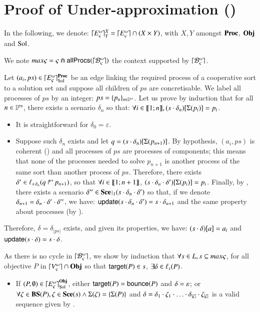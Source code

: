 \section{Proof of Under-approximation ()}
\label{suppl:demoapproxinf}

In the following, we denote:
$\lceil E_\varsigma^\omega\rceil^{X}_{Y} = \lceil E_\varsigma^\omega\rceil \cap (X \times Y)$, with $X, Y$ amongst $\mathbf{Proc}$, $\mathbf{Obj}$ and $\mathrm{Sol}$.

\begin{proofapproxinf}
We note $max\varsigma = \varsigma \Cap \mathsf{allProcs}(\lceil \mathcal{B}_\varsigma^\omega\rceil)$ the context supported by $\lceil \mathcal{B}_\varsigma^\omega\rceil$.

Let $(a_i, ps) \in \lceil E_\varsigma^\omega\rceil^{\mathbf{Proc}}_{\mathrm{Sol}}$ be an edge linking the required process of a cooperative sort to a solution set and suppose all children of $ps$ are concretisable.
We label all processes of $ps$ by an integer: $ps = \{ p_n \}_{n \in \mathbb{I}^{ps}}$.
Let us prove by induction that for all $n \in \mathbb{I}^{ps}$, there exists a scenario $\delta_n$ so that:
$\forall i \in \llbracket 1; n \rrbracket, {(s \cdot \delta_n)[\Sigma(p_i)]} = p_i$.
\begin{itemize}
  \item It is straightforward for $\delta_0 = \varepsilon$.
  \item Suppose such $\delta_n$ exists and let $q = {(s \cdot \delta_n)[\Sigma(p_{n+1})]}$.
    By hypothesis, $(a_i, ps)$ is coherent () and all processes of $ps$ are processes of components;
    this means that none of the processes needed to solve $p_{n+1}$ is another process of the same sort than another process of $ps$.
    Therefore, there exists $\delta' \in \ell_{s \cdot \delta_n}(\mbox{$q\Rsh^*\!p_{n+1}$})$,
    so that $\forall i \in \llbracket 1; n+1 \rrbracket$, ${(s \cdot \delta_n \cdot \delta')[\Sigma(p_{i})]} = p_{i}$.
    Finally, by , there exists a scenario $\delta'' \in \restriction{\Sce}{1}(s \PHplay \delta_n \PHplay \delta')$
    so that, if we denote $\delta_{n+1} = \delta_n \cdot \delta' \cdot \delta''$,
    we have: $\mathsf{update}(s \cdot \delta_n \cdot \delta') = s \cdot \delta_{n+1}$ and the same property about processes (by ).
\end{itemize}
Therefore, $\delta = \delta_{|ps|}$ exists, and given its properties, we have: ${(s \cdot \delta)[a]} = a_i$
and $\mathsf{update}(s \cdot \delta) = s \cdot \delta$.

As there is no cycle in $\lceil \mathcal{B}_\varsigma^\omega\rceil$, we show by induction that $\forall s\in L, s\subseteq max\varsigma$, 
for all objective $P$ in $\lceil V_\varsigma^\omega\rceil \cap \mathbf{Obj}$ so that $\mathsf{target}(P) \in s$,
$\exists \delta \in \ell_s(P)$.%
\begin{itemize}
  \item If $(P, \emptyset) \in \lceil E_\varsigma^\omega\rceil^{\mathbf{Obj}}_{\mathrm{Sol}}$, either $\mathsf{target}(P) = \mathsf{bounce}(P)$ and $\delta = \varepsilon$;
    or $\forall \zeta \in \mathbf{BS}(P), \zeta \in \mathbf{Sce}(s) \wedge \Sigma(\zeta) = \{ \Sigma(P) \}$
    and $\delta = \delta_1 \PHplay \zeta_1 \PHplay \dots \PHplay \delta_{|\zeta|} \PHplay \zeta_{|\zeta|}$ is a valid sequence given by .


\end{itemize}
\end{proofapproxinf}

